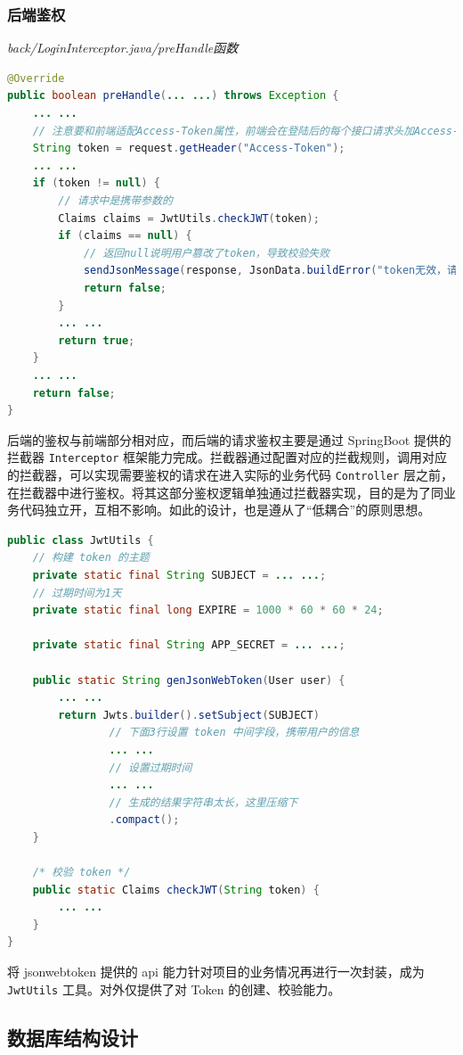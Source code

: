 \subsubsection{后端鉴权}
\noindent\textit{back/LoginInterceptor.java/preHandle函数}
\begin{lstlisting}[language=Java]
@Override
public boolean preHandle(... ...) throws Exception {
    ... ...
    // 注意要和前端适配Access-Token属性，前端会在登陆后的每个接口请求头加Access-Token属性
    String token = request.getHeader("Access-Token");
    ... ...
    if (token != null) {
        // 请求中是携带参数的
        Claims claims = JwtUtils.checkJWT(token);
        if (claims == null) {
            // 返回null说明用户篡改了token，导致校验失败
            sendJsonMessage(response, JsonData.buildError("token无效，请重新登录"));
            return false;
        }
        ... ...
        return true;
    }
    ... ...
    return false;
}
\end{lstlisting}
后端的鉴权与前端部分相对应，而后端的请求鉴权主要是通过 SpringBoot 提供的拦截器 \lstinline!Interceptor! 框架能力完成。拦截器通过配置对应的拦截规则，调用对应的拦截器，可以实现需要鉴权的请求在进入实际的业务代码 \lstinline!Controller! 层之前，在拦截器中进行鉴权。将其这部分鉴权逻辑单独通过拦截器实现，目的是为了同业务代码独立开，互相不影响。如此的设计，也是遵从了“低耦合”的原则思想。
\begin{lstlisting}[language=Java]
public class JwtUtils {
    // 构建 token 的主题
    private static final String SUBJECT = ... ...;
    // 过期时间为1天
    private static final long EXPIRE = 1000 * 60 * 60 * 24;

    private static final String APP_SECRET = ... ...;

    public static String genJsonWebToken(User user) {
        ... ...
        return Jwts.builder().setSubject(SUBJECT)
                // 下面3行设置 token 中间字段，携带用户的信息
                ... ...
                // 设置过期时间
                ... ...
                // 生成的结果字符串太长，这里压缩下
                .compact();
    }

    /* 校验 token */
    public static Claims checkJWT(String token) {
        ... ...
    }
}
\end{lstlisting}

将 jsonwebtoken 提供的 api 能力针对项目的业务情况再进行一次封装，成为 \lstinline!JwtUtils! 工具。对外仅提供了对 Token 的创建、校验能力。

\subsection{数据库结构设计}
